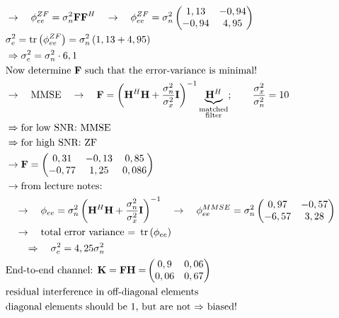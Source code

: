 \begin{align*}
	& \rightarrow\quad\phi_{ee}^{ZF}=\sigma_n^2\mathbf{FF}^H\quad\rightarrow\quad\phi_{ee}^{ZF}=\sigma_n^2
	\begin{pmatrix}
	1,13 & -0,94 \\
	-0,94 & 4,95
	\end{pmatrix} \\
	& \sigma_e^2=\tr\left(\phi_{ee}^{ZF}\right)=\sigma_n^2\left(1,13+4,95\right) \\
	& \Rightarrow\sigma_e^2=\sigma_n^2\cdot 6,1 \\
	& \text{Now determine $\mathbf{F}$ such that the error-variance is minimal!} \\
	& \rightarrow\quad\text{MMSE}\quad\rightarrow\quad\mathbf{F}=\left(\mathbf{H}^H\mathbf{H}+\frac{\sigma_n^2}{\sigma_x^2}\mathbf{I}\right)^{-1}\underbrace{\mathbf{H}^H}_{\substack{\text{matched}\\ \text{filter}}};\qquad\frac{\sigma_x^2}{\sigma_n^2}=10 \\
	& \Rightarrow\text{for low SNR: MMSE} \\
	& \Rightarrow\text{for high SNR: ZF} \\
	& \rightarrow\mathbf{F}=
	\begin{pmatrix}
	0,31 & -0,13 & 0,85 \\
	-0,77 & 1,25 & 0,086
	\end{pmatrix} \\
	& \rightarrow\text{from lecture notes:} \\
	& \quad\rightarrow\quad\phi_{ee}=\sigma_n^2\left(\mathbf{H}^H\mathbf{H}+\frac{\sigma_n^2}{\sigma_x^2}\mathbf{I}\right)^{-1}\quad\rightarrow\quad\phi_{ee}^{MMSE}=\sigma_n^2
	\begin{pmatrix}
	0,97 & -0,57 \\
	-6,57 & 3,28
	\end{pmatrix} \\
	& \quad\rightarrow\quad\text{total error variance = }\tr\left(\phi_{ee}\right) \\
	& \qquad\Rightarrow\quad\sigma_e^2=4,25\sigma_n^2 \\
	& \text{End-to-end channel: }\mathbf{K=FH=}
	\begin{pmatrix}
	0,9 & 0,06 \\
	0,06 & 0,67
	\end{pmatrix} \\
	& \text{residual interference in off-diagonal elements} \\
	&	\text{diagonal elements should be 1, but are not $\Rightarrow$ biased!} \\

\end{align*}
